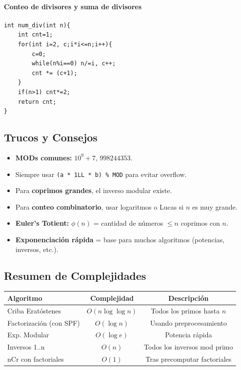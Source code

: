 \documentclass{article}
\begin{document}
\paragraph{Conteo de divisores y suma de divisores}
\begin{lstlisting}[style=cppstyle]
int num_div(int n){
    int cnt=1;
    for(int i=2, c;i*i<=n;i++){
        c=0;
        while(n%i==0) n/=i, c++;
        cnt *= (c+1);
    }
    if(n>1) cnt*=2;
    return cnt;
}
\end{lstlisting}


\subsection{Trucos y Consejos}

\begin{itemize}
  \item \textbf{MODs comunes:} \(10^9+7\), \(998244353\).
  \item Siempre usar \lstinline|(a * 1LL * b) % MOD| para evitar overflow.
  \item Para \textbf{coprimos grandes}, el inverso modular existe.
  \item Para \textbf{conteo combinatorio}, usar logaritmos o Lucas si \(n\) es muy grande.
  \item \textbf{Euler’s Totient:} \(\phi(n)\) = cantidad de números \(\le n\) coprimos con \(n\).
  \item \textbf{Exponenciación rápida} = base para muchos algoritmos (potencias, inversos, etc.).
\end{itemize}


\subsection{Resumen de Complejidades}

\begin{center}
\begin{tabular}{lcc}
\hline
Algoritmo & Complejidad & Descripción \\
\hline
Criba Eratóstenes & \(O(n \log\log n)\) & Todos los primos hasta \(n\) \\
Factorización (con SPF) & \(O(\log n)\) & Usando preprocesamiento \\
Exp. Modular & \(O(\log e)\) & Potencia rápida \\
Inversos 1..n & \(O(n)\) & Todos los inversos mod primo \\
nCr con factoriales & \(O(1)\) & Tras precomputar factoriales \\
\hline
\end{tabular}
\end{center}
\end{document}
